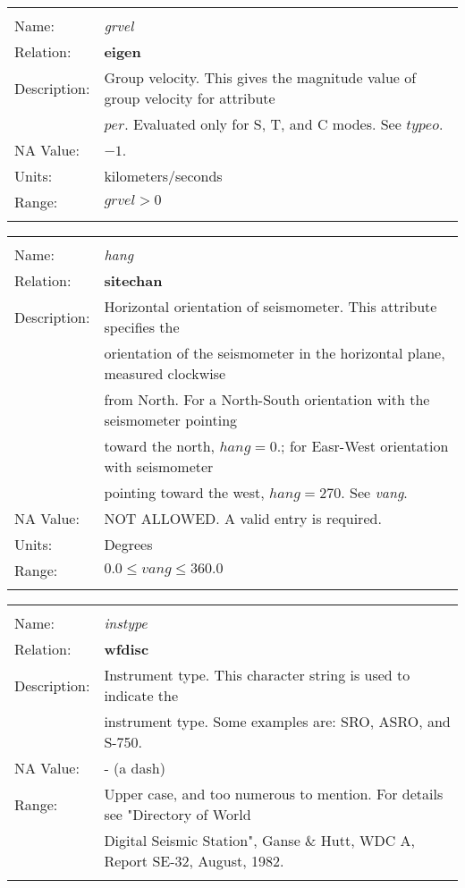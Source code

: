 \begin{tabular*}{6.5 in}{ll} \hline
\\
Name: & {\it grvel} \\
Relation: & {\bf eigen} \\
Description: & Group velocity. This gives the magnitude value of group velocity for attribute \\
& $per$. Evaluated only for S, T, and C modes. See $typeo$. \\
NA Value: & $-1$. \\
Units: & kilometers/seconds \\
Range: & $grvel > 0$ \\
&\\
\end{tabular*}
\begin{tabular*}{6.5 in}{ll} \hline
\\
Name: & {\it hang } \\
Relation: & {\bf sitechan} \\
Description: & Horizontal orientation of seismometer. This attribute specifies the \\
& orientation of the seismometer in the horizontal plane, measured clockwise \\
& from North. For a North-South orientation with the seismometer pointing \\
& toward the north, $hang = 0.$; for Easr-West orientation with seismometer \\
& pointing toward the west, $hang=270$. See {\it vang}. \\
NA Value: & NOT ALLOWED. A valid entry is required. \\
Units: & Degrees \\
Range: & $0.0 \leq vang \leq 360.0$ \\
&\\
\end{tabular*}
\begin{tabular*}{6.5 in}{ll} \hline
\\
Name: & {\it instype } \\
Relation: & {\bf wfdisc} \\
Description: & Instrument type. This character string is used to indicate the \\
& instrument type. Some examples are: SRO, ASRO, and S-750. \\
NA Value: & - (a dash) \\
Range: & Upper case, and too numerous to mention. For details see "Directory of World \\
& Digital Seismic Station", Ganse \& Hutt, WDC A, Report SE-32, August, 1982. \\
&\\
\end{tabular*}
